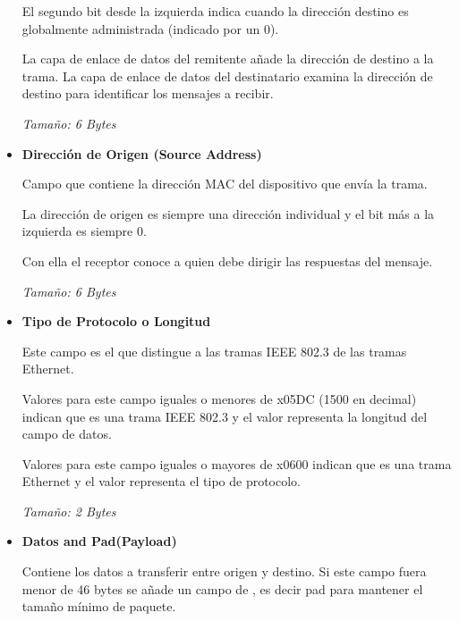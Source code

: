 \documentclass[12pt, fleqn]{report}                             %
\newcommand \Quote {\qq}                                        %
\theoremstyle{break}                                            %
\begin{document}
\begin{itemize}
                            El segundo bit desde la izquierda indica cuando la dirección destino es globalmente administrada
                            (indicado por un 0). 

                            La capa de enlace de datos del remitente añade la dirección de destino a la trama.
                            La capa de enlace de datos del destinatario examina la dirección de destino para identificar
                            los mensajes a recibir. 

                            \emph{Tamaño: 6 Bytes} 

                    \clearpage

                    \item
                        \textbf{Dirección de Origen (Source Address)}

                            Campo que contiene la dirección MAC del dispositivo que envía la trama.

                            La dirección de origen es siempre una dirección individual y el bit más a la izquierda es
                            siempre 0.

                            Con ella el receptor conoce a quien debe dirigir las respuestas del mensaje. 
                            
                            \emph{Tamaño: 6 Bytes} 

                    \item
                        \textbf{Tipo de Protocolo o Longitud}

                            Este campo es el que distingue a las tramas IEEE 802.3 de las tramas Ethernet. 

                            Valores para este campo iguales o menores de x05DC (1500 en decimal) indican que es una trama IEEE 802.3 y
                            el valor representa la longitud del campo de datos. 

                            Valores para este campo iguales o mayores de x0600 indican que es una trama Ethernet y el valor representa
                            el tipo de protocolo. 

                            \emph{Tamaño: 2 Bytes} 

                    \item
                        \textbf{Datos and Pad(Payload)}

                        Contiene los datos a transferir entre origen y destino.
                        Si este campo fuera menor de 46 bytes se añade un campo de \Quote{relleno}, es decir pad para mantener
                        el tamaño mínimo de paquete.


\end{itemize}
\end{document}

